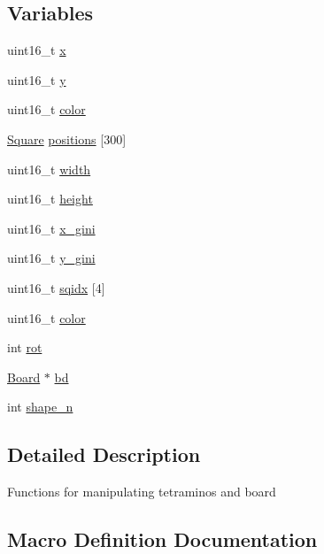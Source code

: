 \subsection*{Variables}
\begin{DoxyCompactItemize}
\item 
uint16\+\_\+t \mbox{\hyperlink{group__tetramino_ga4dde988b1b2adba65ae3efa69f65d960}{x}}
\item 
uint16\+\_\+t \mbox{\hyperlink{group__tetramino_gab0580f504a7428539be299fa71565f30}{y}}
\item 
uint16\+\_\+t \mbox{\hyperlink{group__tetramino_ga0b10c5b0fa8e65e009263b93ba2671ae}{color}}
\item 
\mbox{\hyperlink{struct_square}{Square}} \mbox{\hyperlink{group__tetramino_ga4eedd16e00191125d9b7c28eed681ef4}{positions}} \mbox{[}300\mbox{]}
\item 
uint16\+\_\+t \mbox{\hyperlink{group__tetramino_gad0eab1042455a2067c812ab8071d5376}{width}}
\item 
uint16\+\_\+t \mbox{\hyperlink{group__tetramino_ga81c9f8d0b8c3b49d770be14dbe9f0d37}{height}}
\item 
uint16\+\_\+t \mbox{\hyperlink{group__tetramino_ga92d26140c764e05f62f37639fb87fc88}{x\+\_\+gini}}
\item 
uint16\+\_\+t \mbox{\hyperlink{group__tetramino_gafccac8a8a85671bdaf9a927aaefb0b05}{y\+\_\+gini}}
\item 
uint16\+\_\+t \mbox{\hyperlink{group__tetramino_ga9d0491d7027bf54689b51ff9e57b3703}{sqidx}} \mbox{[}4\mbox{]}
\item 
uint16\+\_\+t \mbox{\hyperlink{group__tetramino_ga0b10c5b0fa8e65e009263b93ba2671ae}{color}}
\item 
int \mbox{\hyperlink{group__tetramino_gae4edf8f6630ef7f8b4c587348a3001a7}{rot}}
\item 
\mbox{\hyperlink{struct_board}{Board}} $\ast$ \mbox{\hyperlink{group__tetramino_ga30c121d94ba906148e5a4b0546e723a3}{bd}}
\item 
int \mbox{\hyperlink{group__tetramino_ga7aa41fc2efed4bde82530b155c4000f1}{shape\+\_\+n}}
\end{DoxyCompactItemize}


\subsection{Detailed Description}
Functions for manipulating tetraminos and board 

\subsection{Macro Definition Documentation}
\mbox{\label{group__tetramino_gaec71d31827b6eb16515454097e75cf12}} 

